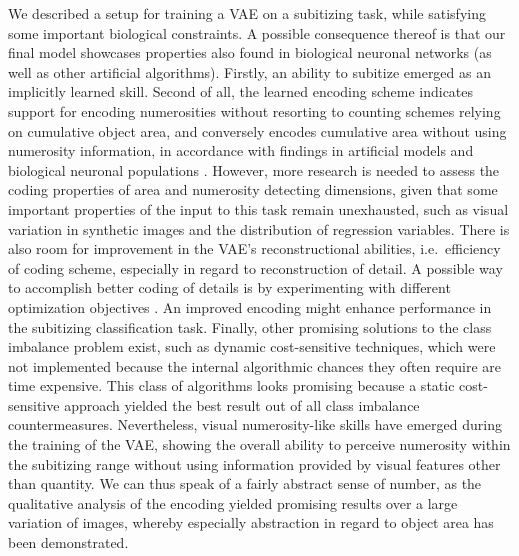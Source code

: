 \documentclass[twocolumn]{article}
\begin{document}
We described a setup for training a VAE on a subitizing task, while
satisfying some important biological constraints. A possible consequence
thereof is that our final model showcases properties also found in
biological neuronal networks (as well as other artificial algorithms).
Firstly, an ability to subitize emerged as an implicitly learned skill.
Second of all, the learned encoding scheme indicates support for
encoding numerosities without resorting to counting schemes relying on
cumulative object area, and conversely encodes cumulative area
without using numerosity information, in accordance with findings in artificial models \citep{stoianov2012} and biological neuronal populations \citep{harvey2013topographic, nieder2016neuronal}. However,
more research is needed to assess the coding properties of area and numerosity detecting dimensions, given that some important properties of the input to this task remain unexhausted, such as visual variation in synthetic images and the distribution of regression variables.
There is also room for improvement in the VAE's reconstructional abilities,
i.e.~efficiency of coding scheme, especially in regard to reconstruction of detail. A possible way to accomplish better coding of details is by experimenting with different optimization objectives \citep[e.g.][]{dosovitskiy2016generating}. An improved encoding might enhance performance in the subitizing classification task. Finally, other promising solutions to the class imbalance problem exist, such as dynamic cost-sensitive techniques, which were not implemented because the internal algorithmic chances they often require are time expensive. This class of algorithms looks promising because a static cost-sensitive approach yielded the best result out of all class imbalance countermeasures. 
Nevertheless, visual numerosity-like skills have emerged during the
training of the VAE, showing the overall ability to perceive numerosity
within the subitizing range without using information provided by visual
features other than quantity. We can thus speak of a fairly abstract
sense of number, as the qualitative analysis of the encoding yielded
promising results over a large variation of images, whereby especially
abstraction in regard to object area has been demonstrated.


\end{document}
